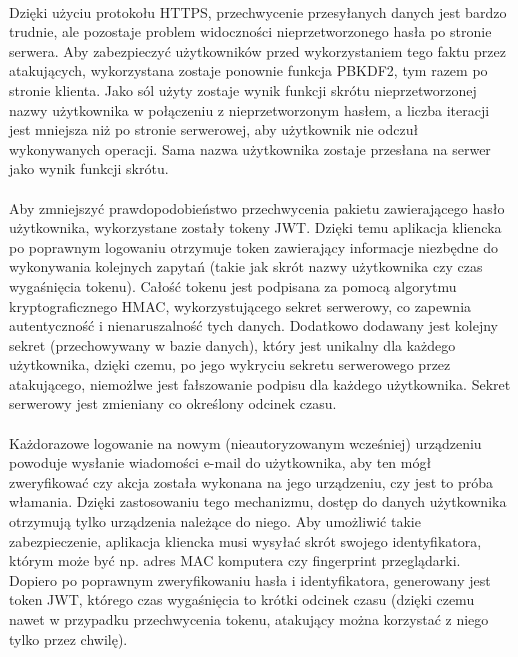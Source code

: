 \documentclass{article}
\begin{document}
    \paragraph{}Dzięki użyciu protokołu HTTPS, przechwycenie przesyłanych danych jest bardzo trudnie, ale pozostaje problem widoczności nieprzetworzonego hasła po stronie serwera. Aby zabezpieczyć użytkowników przed wykorzystaniem tego faktu przez atakujących, wykorzystana zostaje ponownie funkcja PBKDF2, tym razem po stronie klienta. Jako sól użyty zostaje wynik funkcji skrótu nieprzetworzonej nazwy użytkownika w połączeniu z nieprzetworzonym hasłem, a liczba iteracji jest mniejsza niż po stronie serwerowej, aby użytkownik nie odczuł wykonywanych operacji. Sama nazwa użytkownika zostaje przesłana na serwer jako wynik funkcji skrótu.

    \paragraph{}Aby zmniejszyć prawdopodobieństwo przechwycenia pakietu zawierającego hasło użytkownika, wykorzystane zostały tokeny JWT. Dzięki temu aplikacja kliencka po poprawnym logowaniu otrzymuje token zawierający informacje niezbędne do wykonywania kolejnych zapytań (takie jak skrót nazwy użytkownika czy czas wygaśnięcia tokenu). Całość tokenu jest podpisana za pomocą algorytmu kryptograficznego HMAC, wykorzystującego sekret serwerowy, co zapewnia autentyczność i nienaruszalność tych danych. Dodatkowo dodawany jest kolejny sekret (przechowywany w bazie danych), który jest unikalny dla każdego użytkownika, dzięki czemu, po jego wykryciu sekretu serwerowego przez atakującego, niemożlwe jest fałszowanie podpisu dla każdego użytkownika. Sekret serwerowy jest zmieniany co określony odcinek czasu.

    \paragraph{}Każdorazowe logowanie na nowym (nieautoryzowanym wcześniej) urządzeniu powoduje wysłanie wiadomości e-mail do użytkownika, aby ten mógł zweryfikować czy akcja została wykonana na jego urządzeniu, czy jest to próba włamania. Dzięki zastosowaniu tego mechanizmu, dostęp do danych użytkownika otrzymują tylko urządzenia należące do niego. Aby umożliwić takie zabezpieczenie, aplikacja kliencka musi wysyłać skrót swojego identyfikatora, którym może być np. adres MAC komputera czy fingerprint przeglądarki. Dopiero po poprawnym zweryfikowaniu hasła i identyfikatora, generowany jest token JWT, którego czas wygaśnięcia to krótki odcinek czasu (dzięki czemu nawet w przypadku przechwycenia tokenu, atakujący można korzystać z niego tylko przez chwilę).
\end{document}
